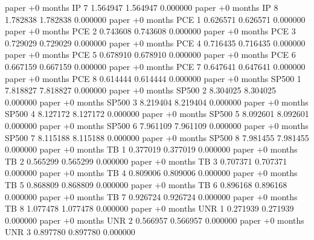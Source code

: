      paper +0 months       IP                 7 1.564947       1.564947           0.000000
     paper +0 months       IP                 8 1.782838       1.782838           0.000000
     paper +0 months      PCE                 1 0.626571       0.626571           0.000000
     paper +0 months      PCE                 2 0.743608       0.743608           0.000000
     paper +0 months      PCE                 3 0.729029       0.729029           0.000000
     paper +0 months      PCE                 4 0.716435       0.716435           0.000000
     paper +0 months      PCE                 5 0.678910       0.678910           0.000000
     paper +0 months      PCE                 6 0.667159       0.667159           0.000000
     paper +0 months      PCE                 7 0.647641       0.647641           0.000000
     paper +0 months      PCE                 8 0.614444       0.614444           0.000000
     paper +0 months    SP500                 1 7.818827       7.818827           0.000000
     paper +0 months    SP500                 2 8.304025       8.304025           0.000000
     paper +0 months    SP500                 3 8.219404       8.219404           0.000000
     paper +0 months    SP500                 4 8.127172       8.127172           0.000000
     paper +0 months    SP500                 5 8.092601       8.092601           0.000000
     paper +0 months    SP500                 6 7.961109       7.961109           0.000000
     paper +0 months    SP500                 7 8.115188       8.115188           0.000000
     paper +0 months    SP500                 8 7.981455       7.981455           0.000000
     paper +0 months       TB                 1 0.377019       0.377019           0.000000
     paper +0 months       TB                 2 0.565299       0.565299           0.000000
     paper +0 months       TB                 3 0.707371       0.707371           0.000000
     paper +0 months       TB                 4 0.809006       0.809006           0.000000
     paper +0 months       TB                 5 0.868809       0.868809           0.000000
     paper +0 months       TB                 6 0.896168       0.896168           0.000000
     paper +0 months       TB                 7 0.926724       0.926724           0.000000
     paper +0 months       TB                 8 1.077478       1.077478           0.000000
     paper +0 months      UNR                 1 0.271939       0.271939           0.000000
     paper +0 months      UNR                 2 0.566957       0.566957           0.000000
     paper +0 months      UNR                 3 0.897780       0.897780           0.000000
